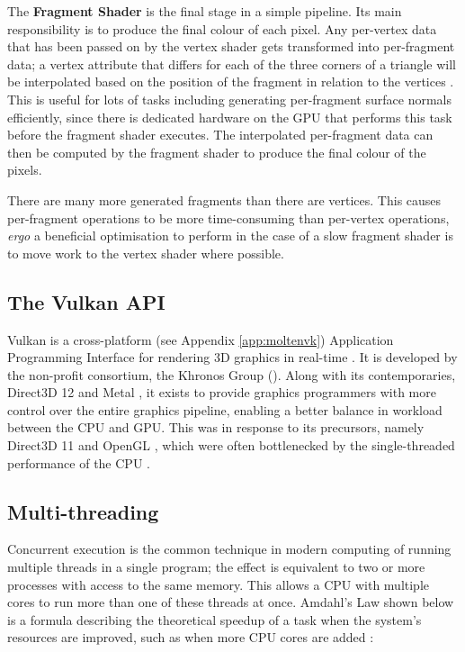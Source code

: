 \documentclass[11pt, a4paper, twocolumn]{article}
\begin{document}
The \textbf{Fragment Shader} is the final stage in a simple pipeline. Its main responsibility is to produce the final colour of each pixel. Any per-vertex data that has been passed on by the vertex shader gets transformed into per-fragment data; a vertex attribute that differs for each of the three corners of a triangle will be interpolated based on the position of the fragment in relation to the vertices \citep{LighthouseInterpolation}. This is useful for lots of tasks including generating per-fragment surface normals efficiently, since there is dedicated hardware on the GPU that performs this task before the fragment shader executes. The interpolated per-fragment data can then be computed by the fragment shader to produce the final colour of the pixels.

There are many more generated fragments than there are vertices. This causes per-fragment operations to be more time-consuming than per-vertex operations, \emph{ergo} a beneficial optimisation to perform in the case of a slow fragment shader is to move work to the vertex shader where possible.

\subsection{The Vulkan API}

Vulkan is a cross-platform (see Appendix \ref{app:moltenvk}) Application Programming Interface for rendering 3D graphics in real-time \citep{Vulkan}. It is developed by the non-profit consortium, the Khronos Group (\citeyear{Khronos}). Along with its contemporaries, Direct3D 12 \citep{d3D12} and Metal \citep{AppleMetal}, it exists to provide graphics programmers with more control over the entire graphics pipeline, enabling a better balance in workload between the CPU and GPU. This was in response to its precursors, namely Direct3D 11 \citep{d3D11} and OpenGL \citep{OpenGLDocs}, which were often bottlenecked by the single-threaded performance of the CPU \citep{Joseph2016}.

\subsection{Multi-threading}

Concurrent execution is the common technique in modern computing of running multiple threads in a single program; the effect is equivalent to two or more processes with access to the same memory. This allows a CPU with multiple cores to run more than one of these threads at once. Amdahl's Law \citep{Rodgers1985} shown below is a formula describing the theoretical speedup of a task when the system's resources are improved, such as when more CPU cores are added \citep{Hill2017}:
\end{document}
